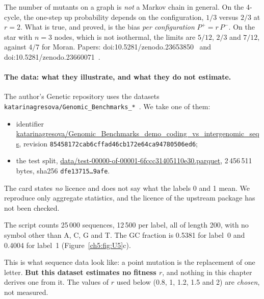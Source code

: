 The number of mutants on a graph is \emph{not} a Markov chain in general. On the 4-cycle, the one-step up
probability depends on the configuration, $1/3$ versus $2/3$ at $r=2$. What is true, and proved, is the bias
\emph{per configuration} $P^+=r\,P^-$. On the star with $n=3$ nodes, which is not isothermal, the limits are
$5/12$, $2/3$ and $7/12$, against $4/7$ for Moran. Papers: doi:10.5281/zenodo.23653850~\cite{ch4:P7} and
doi:10.5281/zenodo.23660071~\cite{ch4:N4}.

\paragraph{The data: what they illustrate, and what they do not estimate.} The author's Genetic repository
uses the datasets \texttt{katarinagresova/Genomic\_Benchmarks\_*}~\cite{ch5:gb}. We take one of them:
\begin{itemize}
\item identifier \url{katarinagresova/Genomic_Benchmarks_demo_coding_vs_intergenomic_seqs}, revision
\texttt{85458172cab6cffad46cb172e64ca94780506ed6};
\item the test split, \url{data/test-00000-of-00001-6fccc31405110e30.parquet}, 2\,456\,511 bytes, sha256
\texttt{dfe13715\dots 9afe}.
\end{itemize}
The card states \emph{no} licence and does not say what the labels 0 and 1 mean. We
reproduce only aggregate statistics, and the licence of the upstream package has not been checked.

The script counts 25\,000 sequences, 12\,500 per label, all of length 200, with no symbol other than A, C, G and T.
The GC fraction is 0.5381 for label~0 and 0.4004 for label~1 (Figure~\ref{ch5:fig:U5}c).

This is what sequence data look like: a point mutation is the replacement of one letter.
\textbf{But this dataset estimates no fitness $r$}, and nothing in this chapter derives one from it. The values of $r$
used below (0.8, 1, 1.2, 1.5 and 2) are \emph{chosen}, not measured.

